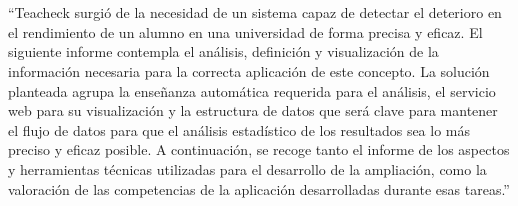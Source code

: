 \chapter*{\abstract}

\setcounter{page}{1} “Teacheck surgió de la necesidad de un sistema
capaz de detectar el deterioro en el rendimiento de un alumno en una
universidad de forma precisa y eficaz. El siguiente informe contempla
el análisis, definición y visualización de la información necesaria
para la correcta aplicación de este concepto. La solución planteada
agrupa la enseñanza automática requerida para el análisis, el servicio
web para su visualización y la estructura de datos que será clave para
mantener el flujo de datos para que el análisis estadístico de los
resultados sea lo más preciso y eficaz posible. A continuación, se
recoge tanto el informe de los aspectos y herramientas técnicas
utilizadas para el desarrollo de la ampliación, como la valoración de
las competencias de la aplicación desarrolladas durante esas tareas.”
